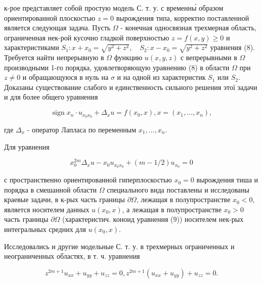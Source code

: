 \documentclass[10pt]{article}
\begin{document}
к-рое представляет собой простую модель С. т. у. с временны́ образом ориентированной плоскостью $z=0$ вырождения типа, корректно поставленной является следующая задача. Пусть $\Omega$ - конечная односвязная трехмерная область, ограниченная нек-рой кусочно гладкой поверхностью $z=f(x, y) \geqslant 0$ и характеристиками $S_{1}: x+x_{0}=\sqrt{y^{2}+z^{2}}, \quad S_{2}: x-x_{0}=\sqrt{y^{2}+z^{2}}$ уравнения (8). Требуется найти непрерывную в $\Omega$ функцию $u(x, y, z)$ с вепрерывными в $\Omega$ производными 1-го порядка, удовлетворяющую уравнению (8) в области $\Omega$ при $z \neq 0$ и обращающуюся в нуль на $\sigma$ и на одной из характеристик $S_{1}$ или $S_{2}$. Доказаны существование слабого и единственность сильного решения этої задачи и для более общего уравнения



\[

\operatorname{sign} x_{n} \cdot u_{x_{0} x_{0}}+\Delta_{x} u=f\left(x_{0}, x\right), x=\left(x_{1}, \ldots, x_{n}\right),

\]



где $\Delta_{x}$ - оператор Лапласа по переменным $x_{1}, \ldots, x_{n}$.



Для уравнения



\[

x_{0}^{2 m} \Delta_{x} u-x_{0} u_{x_{0} x_{0}}+(m-1 / 2) u_{x_{0}}=0

\]



с пространственно ориентированной гиперплоскостью $x_{0}=0$ вырождения тиша и порядка в смешанной области $\Omega$ специального вида поставлены и исследованы краевые задачи, в к-рых часть границы $\partial \Omega$, лежащая в полупространстве $x_{0}<0$, является носителем данных $u\left(x_{0}, x\right)$, а лежащая в полупространстве $x_{0}>0$ часть границы $\partial \Omega$ (характеристич. коноид уравнения (9)) носителем нек-рых интегральных средних для $u\left(x_{0}, x\right)$.



Исследовались и другие модельные С. т. у. в трехмерных ограниченных и неограниченных областях, в т. ч. уравнения



\[

z^{2 m+1} u_{x x}+u_{y y}+u_{z z}=0, z^{2 m+1}\left(u_{x x}+u_{y y}\right)+u_{z z}=0 .

\]
\end{document}
